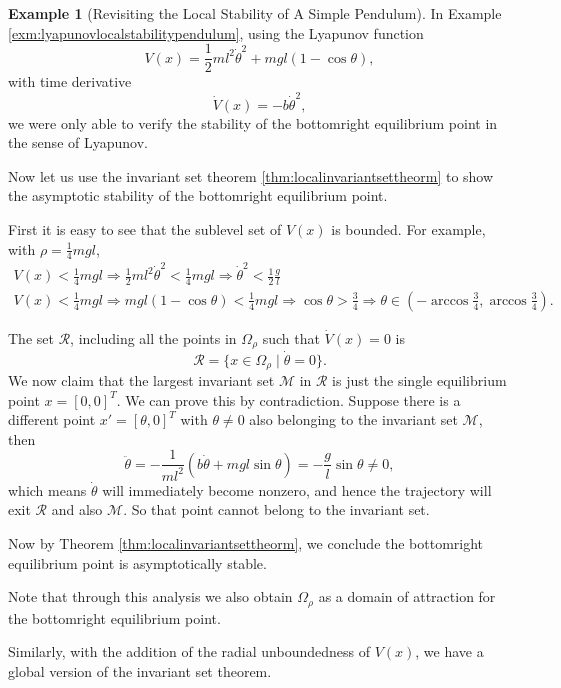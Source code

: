 \documentclass[
]{book}
\theoremstyle{definition}
\theoremstyle{definition}
\newtheorem{example}{Example}[chapter]
\theoremstyle{definition}
\theoremstyle{definition}
\theoremstyle{remark}
\begin{document}
\begin{example}[Revisiting the Local Stability of A Simple Pendulum]
\protect\hypertarget{exm:pendulumlocalstabilitybyinvariantset}{}\label{exm:pendulumlocalstabilitybyinvariantset}In Example \ref{exm:lyapunovlocalstabilitypendulum}, using the Lyapunov function
\[
V(x) = \frac{1}{2} ml^2 \dot{\theta}^2 + mgl(1 - \cos\theta),
\]
with time derivative
\[
\dot{V}(x) = -b\dot{\theta}^2,
\]
we were only able to verify the stability of the bottomright equilibrium point in the sense of Lyapunov.

Now let us use the invariant set theorem \ref{thm:localinvariantsettheorm} to show the asymptotic stability of the bottomright equilibrium point.

First it is easy to see that the sublevel set of \(V(x)\) is bounded. For example, with \(\rho = \frac{1}{4} mgl\),
\begin{align}
V(x) < \frac{1}{4} mgl \Rightarrow \frac{1}{2} ml^2 \dot{\theta}^2 < \frac{1}{4} mgl \Rightarrow \dot{\theta}^2 < \frac{1}{2} \frac{g}{l} \\
V(x) < \frac{1}{4} mgl \Rightarrow mgl(1-\cos\theta) < \frac{1}{4} mgl \Rightarrow \cos\theta > \frac{3}{4} \Rightarrow \theta \in (-\arccos \frac{3}{4}, \arccos \frac{3}{4}).
\end{align}

The set \(\mathcal{R}\), including all the points in \(\Omega_{\rho}\) such that \(\dot{V}(x) = 0\) is
\[
\mathcal{R} = \{ x \in \Omega_{\rho} \mid \dot{\theta} = 0 \}.
\]
We now claim that the largest invariant set \(\mathcal{M}\) in \(\mathcal{R}\) is just the single equilibrium point \(x = [0,0]^T\). We can prove this by contradiction. Suppose there is a different point \(x' = [\theta,0]^T\) with \(\theta \neq 0\) also belonging to the invariant set \(\mathcal{M}\), then
\[
\ddot{\theta} = -\frac{1}{ml^2} (b \dot{\theta} + mgl \sin \theta) = - \frac{g}{l} \sin\theta \neq 0,
\]
which means \(\dot{\theta}\) will immediately become nonzero, and hence the trajectory will exit \(\mathcal{R}\) and also \(\mathcal{M}\). So that point cannot belong to the invariant set.

Now by Theorem \ref{thm:localinvariantsettheorm}, we conclude the bottomright equilibrium point is asymptotically stable.

Note that through this analysis we also obtain \(\Omega_{\rho}\) as a domain of attraction for the bottomright equilibrium point.
\end{example}

Similarly, with the addition of the radial unboundedness of \(V(x)\), we have a global version of the invariant set theorem.
\end{document}
